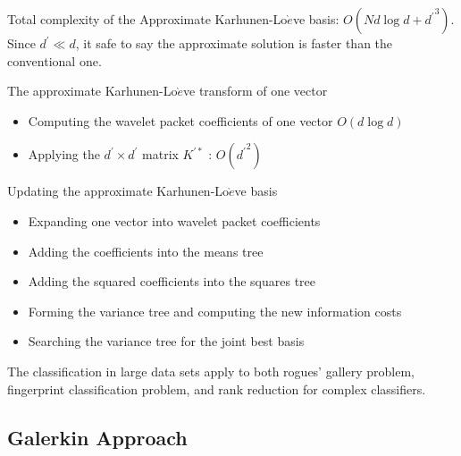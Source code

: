 Total complexity of the Approximate Karhunen-Lo$\grave{e}$ve basis: $O(Nd\log d + {d^\prime}^3)$.  Since $d^\prime \ll d$, it safe to say the approximate solution is faster than the conventional one. 

The approximate Karhunen-Lo$\grave{e}$ve transform of one vector 
\begin{itemize}
\item Computing the wavelet packet coefficients of one vector $O(d \log d)$
\item Applying the $d^\prime \times d^\prime$ matrix $K^{\prime \ast}$ : $O({d^\prime}^2)$
\end{itemize}

Updating the approximate Karhunen-Lo$\grave{e}$ve basis 
\begin{itemize}
\item Expanding one vector into wavelet packet coefficients 
\item Adding the coefficients into the means tree
\item Adding the squared coefficients into the squares tree
\item Forming the variance tree and computing the new information costs
\item Searching the variance tree for the joint best basis
\end{itemize}

The classification in large data sets apply to both rogues' gallery problem, fingerprint classification problem, and rank reduction for complex classifiers.  

\subsection {Galerkin Approach}

\subsection{}


